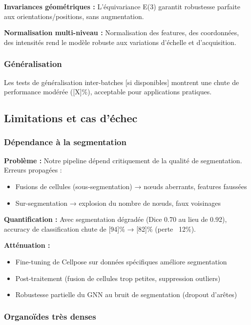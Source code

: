 \textbf{Invariances géométriques :}
L'équivariance E(3) garantit robustesse parfaite aux orientations/positions, sans augmentation.

\textbf{Normalisation multi-niveau :}
Normalisation des features, des coordonnées, des intensités rend le modèle robuste aux variations d'échelle et d'acquisition.

\subsubsection{Généralisation}

Les tests de généralisation inter-batches [si disponibles] montrent une chute de performance modérée ([X]\%), acceptable pour applications pratiques.

\subsection{Limitations et cas d'échec}

\subsubsection{Dépendance à la segmentation}

\textbf{Problème :}
Notre pipeline dépend critiquement de la qualité de segmentation. Erreurs propagées :
\begin{itemize}
    \item Fusions de cellules (sous-segmentation) → nœuds aberrants, features faussées
    \item Sur-segmentation → explosion du nombre de nœuds, faux voisinages
\end{itemize}

\textbf{Quantification :}
Avec segmentation dégradée (Dice 0.70 au lieu de 0.92), accuracy de classification chute de [94]\% → [82]\% (perte ~12\%).

\textbf{Atténuation :}
\begin{itemize}
    \item Fine-tuning de Cellpose sur données spécifiques améliore segmentation
    \item Post-traitement (fusion de cellules trop petites, suppression outliers)
    \item Robustesse partielle du GNN au bruit de segmentation (dropout d'arêtes)
\end{itemize}

\subsubsection{Organoïdes très denses}

